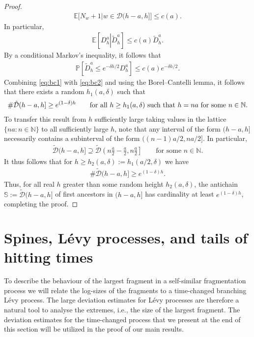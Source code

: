 \documentclass[a4,12pt]{amsart}
\numberwithin{equation}{section}
\begin{document}
\begin{proof}
		\begin{align*}
			\mathbb{E}\big[N_w+1 | w \in \mathcal{D}(h-a,h]\big] \leq c(a).
		\end{align*}
		In particular, 
		\begin{align*}
			\mathbb{E}\left[ D_h^a \left| \tilde{D}_h^a\right. \right] \leq c(a) \tilde{D}_h^a.
		\end{align*}
		By a conditional Markov's inequality, it follows that
		\begin{align} \label{eq:bc2}
			\mathbb{P}\left[ \tilde{D}_h^a \leq e^{ -\delta h/2} D_h^a \right] \leq c(a) e^{ - \delta h/2}.
		\end{align}
		Combining \eqref{eq:bc1} with \eqref{eq:bc2} and using the Borel--Cantelli lemma, 
		it follows that there exists a random $h_1(a,\delta)$ such that 
		\begin{align*}
			\# \tilde{\mathcal{D}}(h-a,h] \geq e^{(1-\delta)h} \qquad 
			\text{for all $h \geq h_1(a,\delta)$ such that $ h  = na $ for some $n \in \mathbb{N}$}.  
		\end{align*} 
		To transfer this result from $h$ sufficiently large taking values in the lattice 
		$\{ n a : n \in \mathbb{N} \}$ to all sufficiently large $h$, 
		note that any interval of the form $(h-a,h]$ necessarily contains a subinterval of the form $((n-1)a/2,na/2]$. In particular,
		\begin{align*}
			\tilde{\mathcal{D}}(h-a,h] \supseteq \tilde{\mathcal{D}}\left(n\frac{a}{2} - \frac{a}{2}, n\frac{a}{2} \right] 
			\qquad \text{for some $n \in \mathbb{N}$}.
		\end{align*}
		It thus follows that for $h \geq h_2(a,\delta) := h_1(a/2,\delta)$ we have
		\begin{align*}
			\# \tilde{\mathcal{D}}(h-a,h] \geq e^{(1-\delta)h}.
		\end{align*}
		Thus, for all real $h$ greater than some random height $h_2(a,\delta)$, 
		the antichain $\mathbb{S} := \tilde{\mathcal{D}}(h-a,h]$ of first ancestors in $(h-a,h]$ 
		has cardinality at least $e^{(1-\delta)h}$, completing the proof.
\end{proof}


\section{Spines, L\'evy processes, and tails of hitting times} \label{sec:levy}

	To describe the behaviour of the largest fragment in a self-similar fragmentation process 
	we will relate the log-sizes of the fragments to a time-changed branching L\'evy process. 
	The large deviation estimates for L\'evy processes are therefore a natural tool to analyse 
	the extremes, i.e., the size of the largest fragment. 
    The deviation estimates 
	for the time-changed process that we present at the end of this section will be utilized in 
	the proof of our main results. 
\end{document}
